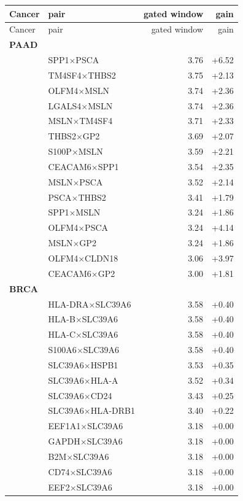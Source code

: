 \begin{longtable}{llrr}\hline\hline
Cancer & pair & gated window & gain\\\hline
\endfirsthead\hline\hline Cancer & pair & gated window & gain\\\hline\endhead
\multicolumn{4}{l}{\textbf{PAAD}}\\\hline
 & SPP1$\times$PSCA & 3.76 & +6.52\\
 & TM4SF4$\times$THBS2 & 3.75 & +2.13\\
 & OLFM4$\times$MSLN & 3.74 & +2.36\\
 & LGALS4$\times$MSLN & 3.74 & +2.36\\
 & MSLN$\times$TM4SF4 & 3.71 & +2.33\\
 & THBS2$\times$GP2 & 3.69 & +2.07\\
 & S100P$\times$MSLN & 3.59 & +2.21\\
 & CEACAM6$\times$SPP1 & 3.54 & +2.35\\
 & MSLN$\times$PSCA & 3.52 & +2.14\\
 & PSCA$\times$THBS2 & 3.41 & +1.79\\
 & SPP1$\times$MSLN & 3.24 & +1.86\\
 & OLFM4$\times$PSCA & 3.24 & +4.14\\
 & MSLN$\times$GP2 & 3.24 & +1.86\\
 & OLFM4$\times$CLDN18 & 3.06 & +3.97\\
 & CEACAM6$\times$GP2 & 3.00 & +1.81\\
\multicolumn{4}{l}{\textbf{BRCA}}\\\hline
 & HLA-DRA$\times$SLC39A6 & 3.58 & +0.40\\
 & HLA-B$\times$SLC39A6 & 3.58 & +0.40\\
 & HLA-C$\times$SLC39A6 & 3.58 & +0.40\\
 & S100A6$\times$SLC39A6 & 3.58 & +0.40\\
 & SLC39A6$\times$HSPB1 & 3.53 & +0.35\\
 & SLC39A6$\times$HLA-A & 3.52 & +0.34\\
 & SLC39A6$\times$CD24 & 3.43 & +0.25\\
 & SLC39A6$\times$HLA-DRB1 & 3.40 & +0.22\\
 & EEF1A1$\times$SLC39A6 & 3.18 & +0.00\\
 & GAPDH$\times$SLC39A6 & 3.18 & +0.00\\
 & B2M$\times$SLC39A6 & 3.18 & +0.00\\
 & CD74$\times$SLC39A6 & 3.18 & +0.00\\
 & EEF2$\times$SLC39A6 & 3.18 & +0.00\\

\end{longtable}

